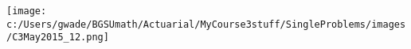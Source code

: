 
\texttt{[image: c:/Users/gwade/BGSUmath/Actuarial/MyCourse3stuff/SingleProblems/images/C3May2015\_12.png]}

\showsol{\bsoln

\esoln}
